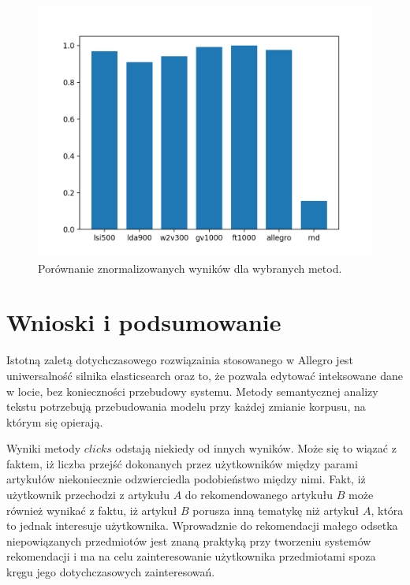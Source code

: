 \documentclass[pl]{minipw} %
\begin{document}
\begin{figure}[H]
	\centering
	\includegraphics[width=1\textwidth]{img/results/lsi500_lda900_w2v300_gv1000_ft1000_allegro_rnd_users.png}
	\caption{Porównanie znormalizowanych wyników dla wybranych metod.}
\end{figure}


\chapter{Wnioski i podsumowanie}

Istotną zaletą dotychczasowego rozwiązainia stosowanego w Allegro jest uniwersalność silnika elasticsearch oraz to, że pozwala edytować inteksowane dane w locie, bez konieczności przebudowy systemu. Metody semantycznej analizy tekstu potrzebują przebudowania modelu przy każdej zmianie korpusu, na którym się opierają. 

Wyniki metody $clicks$ odstają niekiedy od innych wyników. Może się to wiązać z faktem, iż liczba przejść dokonanych przez użytkowników między parami artykułów niekoniecznie odzwierciedla podobieństwo między nimi. Fakt, iż użytkownik przechodzi z artykułu $A$ do rekomendowanego artykułu $B$ może również wynikać z faktu, iż artykuł $B$ porusza inną tematykę niż artykuł $A$, która to jednak interesuje użytkownika. Wprowadznie do rekomendacji małego odsetka niepowiązanych przedmiotów jest znaną praktyką przy tworzeniu systemów rekomendacji i ma na celu zainteresowanie użytkownika przedmiotami spoza kręgu jego dotychczasowych zainteresowań.
\end{document}
